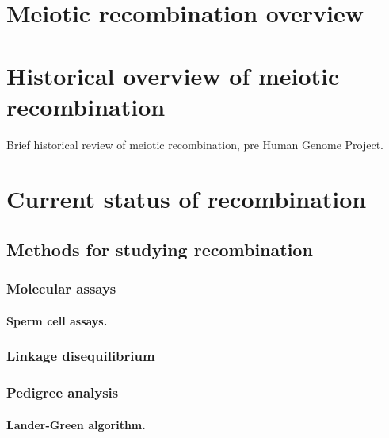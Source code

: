 
\section{Meiotic recombination overview}

\section{Historical overview of meiotic recombination}

Brief historical review of meiotic recombination, pre Human Genome Project.

\section{Current status of recombination}

\subsection{Methods for studying recombination}
\subsubsection{Molecular assays}
\paragraph{Sperm cell assays.}
\subsubsection{Linkage disequilibrium}
\subsubsection{Pedigree analysis}
\paragraph{Lander-Green algorithm.}

